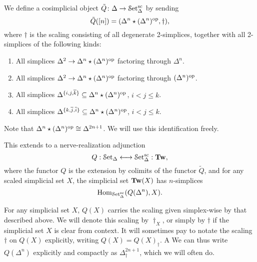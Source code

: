 \documentclass[main.tex]{subfiles}
\begin{document}
\begin{definition}
  We define a cosimplicial object $\tilde{Q}\colon \Delta \to \mathcal{S}\mathrm{et}_{\Delta}^{\mathrm{sc}}$ by sending
  \begin{equation*}
    \tilde{Q}([n]) = (\Delta^{n} \star (\Delta^{n})^{\mathrm{op}}, \dagger),
  \end{equation*}
  where $\dagger$ is the scaling consisting of all degenerate 2-simplices, together with all 2-simplices of the following kinds:
  \begin{enumerate}
    \item All simplices $\Delta^{2} \to \Delta^{n} \star (\Delta^{n})^{\mathrm{op}}$ factoring through $\Delta^{n}$.

    \item All simplices $\Delta^{2} \to \Delta^{n} \star (\Delta^{n})^{\mathrm{op}}$ factoring through $(\Delta^{n})^{\mathrm{op}}$.

    \item All simplices $\Delta^{\{i, j, \overline{k}\}} \subseteq \Delta^{n} \star (\Delta^{n})^{\mathrm{op}}$, $i < j \leq k$.

    \item All simplices $\Delta^{\{k, \overline{j}, \overline{i}\}} \subseteq \Delta^{n} \star (\Delta^{n})^{\mathrm{op}}$, $i < j \leq k$.
  \end{enumerate}
\end{definition}

Note that $\Delta^{n} \star (\Delta^{n})^{\mathrm{op}} \cong \Delta^{2n+1}$. We will use this identification freely.

This extends to a nerve-realization adjunction
\begin{equation*}
  Q : \mathcal{S}\mathrm{et}_{\Delta} \longleftrightarrow \mathcal{S}\mathrm{et}_{\Delta}^{\mathrm{sc}} : \mathbf{Tw},
\end{equation*}
where the functor $Q$ is the extension by colimits of the functor $\tilde{Q}$, and for any scaled simplicial set $X$, the simplicial set $\mathbf{Tw}(X)$ has $n$-simplices
\begin{equation*}
  \mathrm{Hom}_{\mathcal{S}\mathrm{et}_{\Delta}^{\mathrm{sc}}}(Q(\Delta^{n}), X).
\end{equation*}

\begin{notation}
  For any simplicial set $X$, $Q(X)$ carries the scaling given simplex-wise by that described above. We will denote this scaling by $\dagger_{X}$, or simply by $\dagger$ if the simplicial set $X$ is clear from context. It will sometimes pay to notate the scaling $\dagger$ on $Q(X)$ explicitly, writing $Q(X) = Q(X)_{\dagger}$. A We can thus write $Q(\Delta^{n})$ explicitly and compactly as $\Delta^{2n+1}_{\dagger}$, which we will often do.
\end{notation}
\end{document}
